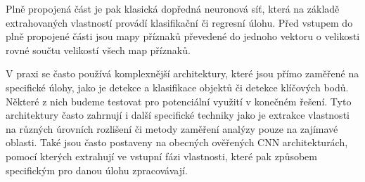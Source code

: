 Plně propojená část je pak klasická dopředná neuronová síť, která na základě
extrahovaných vlastností provádí klasifikační či regresní úlohu. Před vstupem
do plně propojené části jsou mapy příznaků převedené do jednoho vektoru o
velikosti rovné součtu velikostí všech map příznaků.

V praxi se často používá komplexnější architektury, které jsou přímo zaměřené
na specifické úlohy, jako je detekce a klasifikace objektů či detekce klíčových
bodů. Některé z nich budeme testovat pro potenciální využití v konečném řešení.
Tyto architektury často zahrnují i další specifické techniky jako je extrakce
vlastnosti na různých úrovních rozlišení či metody zaměření analýzy pouze na
zajímavé oblasti. Také jsou často postaveny na obecných ověřených CNN
architekturách, pomocí kterých extrahují ve vstupní fázi vlastnosti, které pak
způsobem specifickým pro danou úlohu zpracovávají.

\endinput
